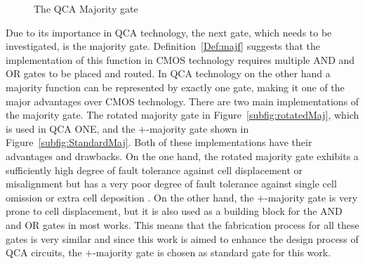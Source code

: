 \begin{figure}
{
		\label{subfig:StandardOr}
	}
	\caption{The QCA Majority gate} \label{fig:QCAMaj}
\end{figure}

Due to its importance in QCA technology, the next gate, which needs to be investigated, is the majority gate. Definition~\ref{Def:majf} suggests that the implementation of this function in CMOS technology requires multiple AND and OR gates to be placed and routed. In QCA technology on the other hand a majority function can be represented by exactly one gate, making it one of the major advantages over CMOS technology. There are two main implementations of the majority gate. The rotated majority gate in Figure~\ref{subfig:rotatedMaj}, which is used in QCA ONE, and the $+$-majority gate shown in Figure~\ref{subfig:StandardMaj}. Both of these implementations have their advantages and drawbacks. On the one hand, the rotated majority gate exhibits a sufficiently high degree of fault tolerance against cell displacement or misalignment but has a very poor degree of fault tolerance against single cell omission or extra cell deposition \cite{majorityrotated}. On the other hand, the $+$-majority gate is very prone to cell displacement, but it is also used as a building block for the AND and OR gates in most works. This means that the fabrication process for all these gates is very similar and since this work is aimed to enhance the design process of QCA circuits, the $+$-majority gate is chosen as standard gate for this work.

